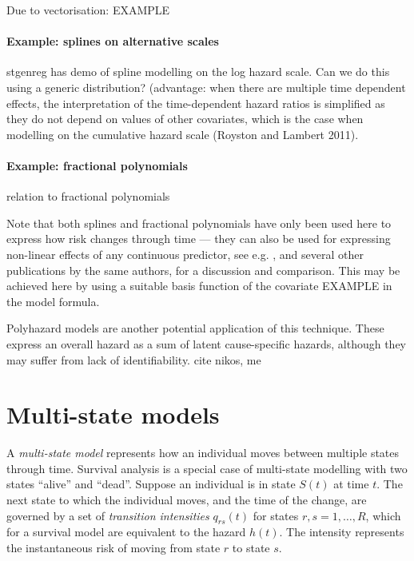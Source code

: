 \documentclass[nojss,nofooter]{jss}
\begin{document}
Due to vectorisation:  EXAMPLE



\paragraph{Example: splines on alternative scales}

stgenreg has demo of spline modelling on the log hazard scale.  Can we do this using a generic distribution? 
(advantage: when there are multiple time dependent effects, the
interpretation of the time-dependent hazard ratios is simplified as
they do not depend on values of other covariates, which is the case
when modelling on the cumulative hazard scale (Royston and Lambert
2011).

\paragraph{Example: fractional polynomials}


relation to fractional polynomials \citep{royston1994regression}

Note that both splines and fractional polynomials have only been used
here to express how risk changes through time --- they can also be
used for expressing non-linear effects of any continuous predictor,
see e.g. \citet{sauerbrei2007selection}, and several other
publications by the same authors, for a discussion and comparison.
This may be achieved here by using a suitable basis function of the
covariate EXAMPLE in the model formula.

Polyhazard models \citep{polyhazard} are another potential application
of this technique.  These express an overall hazard as a sum of latent
cause-specific hazards, although they may suffer from lack of
identifiability.  cite nikos, me

\section{Multi-state models}

A \emph{multi-state model} represents how an individual moves between
multiple states through time.  Survival analysis is a special case of
multi-state modelling with two states ``alive'' and ``dead''. Suppose
an individual is in state $S(t)$ at time $t$.  The next state to which
the individual moves, and the time of the change, are governed by a
set of \emph{transition intensities} $q_{rs}(t)$ for states $r, s =
1,\dots,R$, which for a survival model are equivalent to the hazard
$h(t)$.  The intensity represents the instantaneous risk of moving
from state $r$ to state $s$.
\end{document}
